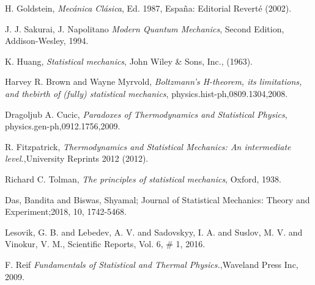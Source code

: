 \documentclass{article}
\begin{document}
\begin{thebibliography}{}
H. Goldstein, {\it Mec\'anica Cl\'asica}, Ed. 1987, Espa\~na: Editorial Revert\'e (2002).

J. J. Sakurai, J. Napolitano {\it Modern Quantum Mechanics}, Second Edition, Addison-Wesley, 1994.

K. Huang, \emph{Statistical mechanics}, John Wiley \& Sons, Inc., (1963).

Harvey R. Brown and Wayne Myrvold, {\it Boltzmann’s H-theorem, its limitations, and thebirth of (fully) statistical mechanics}, physics.hist-ph,0809.1304,2008.

Dragoljub A. Cucic, {\it Paradoxes of Thermodynamics and Statistical Physics}, physics.gen-ph,0912.1756,2009.

R. Fitzpatrick, {\it Thermodynamics and Statistical Mechanics: An intermediate level.},University Reprints 2012 (2012).

 Richard C. Tolman, \emph{The principles of statistical mechanics}, Oxford, 1938.

Das, Bandita and Biswas, Shyamal; Journal of Statistical Mechanics: Theory and Experiment;2018, 10, 1742-5468. 

Lesovik, G. B. and Lebedev, A. V. and Sadovskyy, I. A. and Suslov, M. V. and Vinokur, V. M., Scientific Reports, Vol. 6, \# 1, 2016.

F. Reif {\it Fundamentals of Statistical and Thermal Physics.},Waveland Press Inc, 2009.


\end{thebibliography}{}
\end{document}
